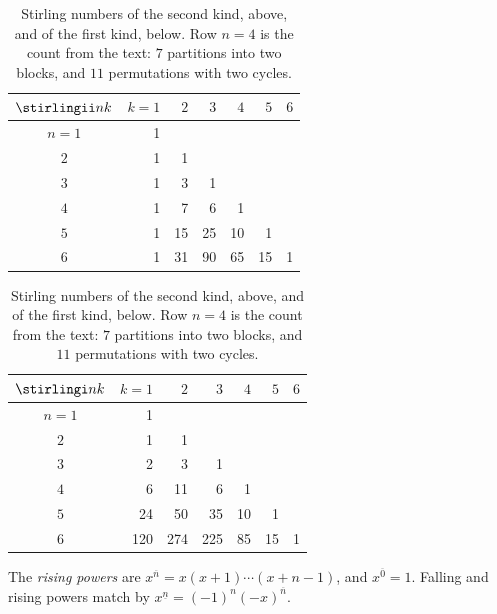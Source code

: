 \begin{table}[ht]
\centering
\begin{tabular}{c|rrrrrr}
$\stirlingii nk$ & $k=1$ & $2$ & $3$ & $4$ & $5$ & $6$\\
\hline
$n=1$ & 1 &&&&&\\
$2$ & 1 & 1 &&&&\\
$3$ & 1 & 3 & 1 &&&\\
$4$ & 1 & 7 & 6 & 1 &&\\
$5$ & 1 & 15 & 25 & 10 & 1 &\\
$6$ & 1 & 31 & 90 & 65 & 15 & 1\\
\end{tabular}

\medskip
\begin{tabular}{c|rrrrrr}
$\stirlingi nk$ & $k=1$ & $2$ & $3$ & $4$ & $5$ & $6$\\
\hline
$n=1$ & 1 &&&&&\\
$2$ & 1 & 1 &&&&\\
$3$ & 2 & 3 & 1 &&&\\
$4$ & 6 & 11 & 6 & 1 &&\\
$5$ & 24 & 50 & 35 & 10 & 1 &\\
$6$ & 120 & 274 & 225 & 85 & 15 & 1\\
\end{tabular}
\caption{Stirling numbers of the second kind, above, and of the first kind, below. Row $n=4$ is the count from the text: $7$ partitions into two blocks, and $11$ permutations with two cycles.}
\label{tab:stirling}
\end{table}

The \emph{rising powers} are $x^{\overline n}=x(x+1)\cdots(x+n-1)$, and $x^{\overline0}=1$. Falling and rising powers match by $x^{\underline n}=(-1)^n(-x)^{\overline n}$.


